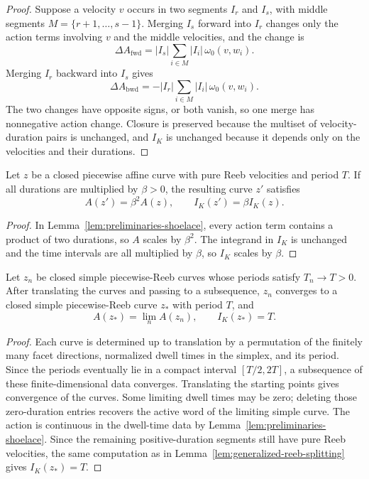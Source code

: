 \begin{proof}
Suppose a velocity \(v\) occurs in two segments \(I_r\) and \(I_s\), with
middle segments \(M=\{r+1,\ldots,s-1\}\). Merging \(I_s\) forward into \(I_r\)
changes only the action terms involving \(v\) and the middle velocities, and
the change is
\[
  \Delta A_{\mathrm{fwd}}
  =
  |I_s|\sum_{i\in M}|I_i|\,\omega_0(v,w_i).
\]
Merging \(I_r\) backward into \(I_s\) gives
\[
  \Delta A_{\mathrm{bwd}}
  =
  -|I_r|\sum_{i\in M}|I_i|\,\omega_0(v,w_i).
\]
The two changes have opposite signs, or both vanish, so one merge has
nonnegative action change. Closure is preserved because the multiset of
velocity-duration pairs is unchanged, and \(I_K\) is unchanged because it
depends only on the velocities and their durations.
\end{proof}

\begin{lemma}[Rescaling]\label{lem:generalized-reeb-rescaling}
Let \(z\) be a closed piecewise affine curve with pure Reeb velocities and
period \(T\). If all durations are multiplied by \(\beta>0\), the resulting
curve \(z'\) satisfies
\[
  A(z')=\beta^2A(z),
  \qquad
  I_K(z')=\beta I_K(z).
\]
\end{lemma}

\begin{proof}
In Lemma~\ref{lem:preliminaries-shoelace}, every action term contains a
product of two durations, so \(A\) scales by \(\beta^2\). The integrand in
\(I_K\) is unchanged and the time intervals are all multiplied by \(\beta\), so
\(I_K\) scales by \(\beta\).
\end{proof}

\begin{lemma}\label{lem:generalized-reeb-compactness}
Let \(z_n\) be closed simple piecewise-Reeb curves whose periods satisfy
\(T_n\to T>0\). After translating the curves and passing to a subsequence,
\(z_n\) converges to a closed simple piecewise-Reeb curve \(z_*\) with period
\(T\), and
\[
  A(z_*)=\lim_n A(z_n),
  \qquad
  I_K(z_*)=T.
\]
\end{lemma}

\begin{proof}
Each curve is determined up to translation by a permutation of the finitely many
facet directions, normalized dwell times in the simplex, and its period. Since
the periods eventually lie in a compact interval \([T/2,2T]\), a subsequence of
these finite-dimensional data converges. Translating the starting points gives
convergence of the curves. Some limiting dwell times may be zero; deleting
those zero-duration entries recovers the active word of the limiting simple
curve. The action is continuous in the dwell-time data by
Lemma~\ref{lem:preliminaries-shoelace}. Since the remaining positive-duration
segments still have pure Reeb velocities, the same computation as in
Lemma~\ref{lem:generalized-reeb-splitting} gives \(I_K(z_*)=T\).
\end{proof}

